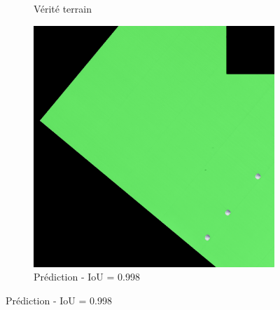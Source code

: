 \begin{figure}[H]
\begin{subfigure}{0.32\textwidth}
    \caption{Vérité terrain}
\end{subfigure}
\hfill
\begin{subfigure}{0.32\textwidth}
    \includegraphics[width=\textwidth]{02-main//figures/ch4/kfold_ensembles/unet_tu-mambaout_small/best_cases/best_5_iou0.998_24991116_tile_5_3_322356_overlay_pred.png}
    \caption{Prédiction - IoU = 0.998}
\end{subfigure}

\vspace{0.35cm}


\end{figure}
